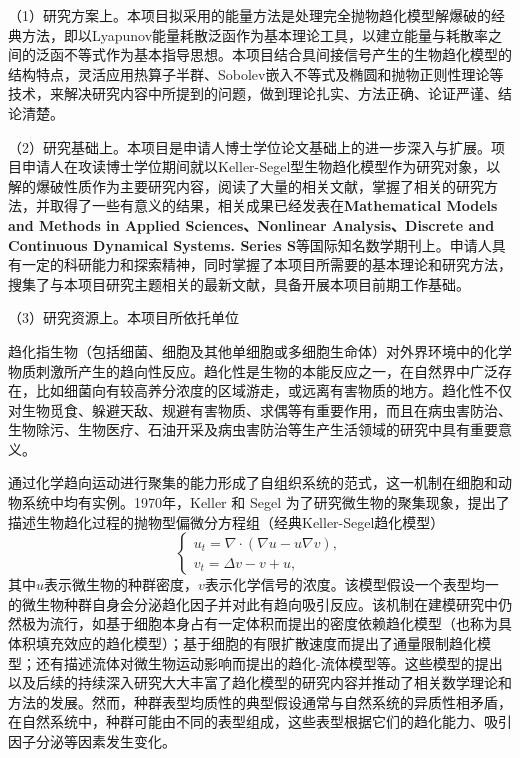 \documentclass[12pt]{article}
\begin{document}
（1）研究方案上。本项目拟采用的能量方法是处理完全抛物趋化模型解爆破的经典方法，即以Lyapunov能量耗散泛函作为基本理论工具，以建立能量与耗散率之间的泛函不等式作为基本指导思想。本项目结合具间接信号产生的生物趋化模型的结构特点，灵活应用热算子半群、Sobolev嵌入不等式及椭圆和抛物正则性理论等技术，来解决研究内容中所提到的问题，做到理论扎实、方法正确、论证严谨、结论清楚。

（2）研究基础上。本项目是申请人博士学位论文基础上的进一步深入与扩展。项目申请人在攻读博士学位期间就以Keller-Segel型生物趋化模型作为研究对象，以解的爆破性质作为主要研究内容，阅读了大量的相关文献，掌握了相关的研究方法，并取得了一些有意义的结果，相关成果已经发表在\textbf{Mathematical Models and Methods in Applied Sciences、Nonlinear Analysis、Discrete and Continuous Dynamical Systems. Series S}等国际知名数学期刊上。申请人具有一定的科研能力和探索精神，同时掌握了本项目所需要的基本理论和研究方法，搜集了与本项目研究主题相关的最新文献，具备开展本项目前期工作基础。

（3）研究资源上。本项目所依托单位



趋化指生物（包括细菌、细胞及其他单细胞或多细胞生命体）对外界环境中的化学物质刺激所产生的趋向性反应。趋化性是生物的本能反应之一，在自然界中广泛存在，比如细菌向有较高养分浓度的区域游走，或远离有害物质的地方。趋化性不仅对生物觅食、躲避天敌、规避有害物质、求偶等有重要作用，而且在病虫害防治、生物除污、生物医疗、石油开采及病虫害防治等生产生活领域的研究中具有重要意义。

通过化学趋向运动进行聚集的能力形成了自组织系统的范式，这一机制在细胞和动物系统中均有实例。1970年，Keller 和 Segel 为了研究微生物的聚集现象，提出了描述生物趋化过程的抛物型偏微分方程组（经典Keller-Segel趋化模型）
\begin{equation}
    \begin{cases}
        u_t = \nabla \cdot(\nabla u - u\nabla v), \\ 
        v_t = \Delta v - v + u,
    \end{cases}
\end{equation} 
其中$u$表示微生物的种群密度，$v$表示化学信号的浓度。该模型假设一个表型均一的微生物种群自身会分泌趋化因子并对此有趋向吸引反应。该机制在建模研究中仍然极为流行，如基于细胞本身占有一定体积而提出的密度依赖趋化模型（也称为具体积填充效应的趋化模型）；基于细胞的有限扩散速度而提出了通量限制趋化模型；还有描述流体对微生物运动影响而提出的趋化-流体模型等。这些模型的提出以及后续的持续深入研究大大丰富了趋化模型的研究内容并推动了相关数学理论和方法的发展。然而，种群表型均质性的典型假设通常与自然系统的异质性相矛盾，在自然系统中，种群可能由不同的表型组成，这些表型根据它们的趋化能力、吸引因子分泌等因素发生变化。
\end{document}
